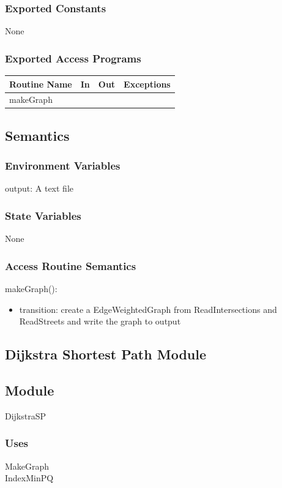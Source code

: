 \documentclass[12pt]{article}
\begin{document}
\subsubsection*{Exported Constants}
None

\subsubsection*{Exported Access Programs}
    \begin{tabular}{|l|l|l|l|}
    \hline
    \textbf{Routine Name} & \textbf{In} & \textbf{Out} & \textbf{Exceptions}\\
    \hline
    makeGraph &  ~ & ~ & ~\\
    \hline
    \end{tabular}
    
\subsection*{Semantics}
\subsubsection*{Environment Variables}
output: A text file

\subsubsection*{State Variables}
None

\subsubsection*{Access Routine Semantics}
\noindent makeGraph():
\begin{itemize}
    \item transition: create a EdgeWeightedGraph from ReadIntersections and ReadStreets and write the graph to output
\end{itemize}

\newpage
\subsection{Dijkstra Shortest Path Module}
\subsection*{Module}
DijkstraSP

\subsubsection*{Uses}
MakeGraph\\
IndexMinPQ
\end{document}
